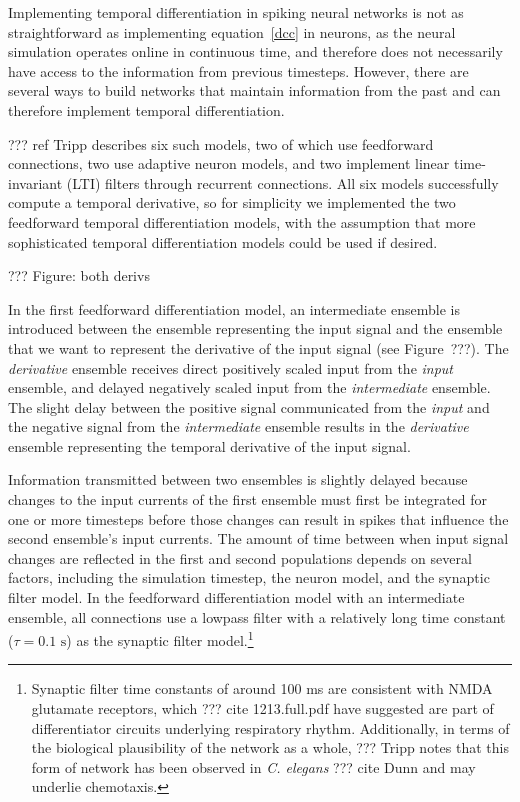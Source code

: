 Implementing temporal differentiation
in spiking neural networks
is not as straightforward as implementing
equation~\eqref{dcc} in neurons,
as the neural simulation operates
online in continuous time,
and therefore does not necessarily
have access to the information
from previous timesteps.
However, there are several ways
to build networks that maintain
information from the past
and can therefore implement temporal differentiation.

??? ref Tripp describes six such models,
two of which use feedforward connections,
two use adaptive neuron models,
and two implement linear time-invariant (LTI) filters
through recurrent connections.
All six models successfully
compute a temporal derivative,
so for simplicity we implemented
the two feedforward temporal differentiation models,
with the assumption that
more sophisticated temporal differentiation
models could be used if desired.

??? Figure: both derivs

In the first feedforward differentiation model,
an intermediate ensemble is introduced
between the ensemble representing the input signal
and the ensemble that we want to represent
the derivative of the input signal
(see Figure~???).
The \textit{derivative} ensemble
receives direct positively scaled input from
the \textit{input} ensemble,
and delayed negatively scaled input from
the \textit{intermediate} ensemble.
The slight delay between the positive signal
communicated from the \textit{input}
and the negative signal
from the \textit{intermediate} ensemble
results in the \textit{derivative} ensemble
representing the temporal derivative
of the input signal.

Information transmitted between two ensembles
is slightly delayed
because changes to the input currents
of the first ensemble
must first be integrated for one or more
timesteps before those changes can result in
spikes that influence
the second ensemble's input currents.
The amount of time between
when input signal changes are reflected
in the first and second populations
depends on several factors,
including the simulation timestep,
the neuron model, and the synaptic filter model.
In the feedforward differentiation model
with an intermediate ensemble,
all connections use a lowpass filter
with a relatively long time constant
($\tau=0.1 \text{ s}$)
as the synaptic filter model.\footnote{
  Synaptic filter time constants of around 100 ms
  are consistent with NMDA glutamate receptors,
  which ??? cite 1213.full.pdf have suggested
  are part of differentiator circuits
  underlying respiratory rhythm.
  Additionally, in terms of
  the biological plausibility of the network as a whole,
  ??? Tripp notes that this form of network
  has been observed in \textit{C. elegans} ??? cite Dunn
  and may underlie chemotaxis.}

